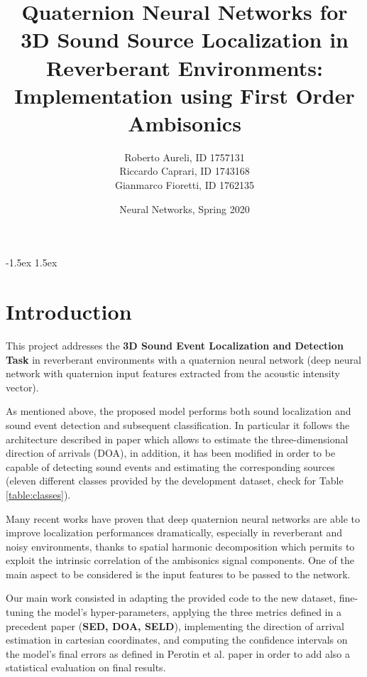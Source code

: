 \documentclass[11pt]{article}
\title{Quaternion Neural Networks for 3D Sound Source Localization in Reverberant Environments: Implementation using First Order Ambisonics}
\author{Roberto Aureli, ID 1757131\\
		Riccardo Caprari, ID 1743168\\
		Gianmarco Fioretti, ID 1762135}
\date{Neural Networks, Spring 2020}
\begin{document}
\maketitle

\vspace{10px}

\openup -1.5ex
\tableofcontents
\openup 1.5ex

\newpage
\section{Introduction}\label{cha:intro}

This project addresses the \textbf{3D Sound Event Localization and Detection Task} in reverberant environments with a  quaternion neural network (deep neural network with quaternion input features extracted from the acoustic intensity vector).\newline

\noindent
As mentioned above, the proposed model performs both sound localization and sound event detection and subsequent classification. In particular it follows the architecture described in paper \cite{paper2020} which allows to estimate the three-dimensional direction of arrivals (DOA), in addition, it has been modified in order to be capable of detecting sound events and estimating the corresponding sources (eleven different classes provided by the development dataset, check for Table \ref{table:classes}).\newline

\noindent
Many recent works have proven that deep quaternion neural networks are able to improve localization performances dramatically, especially in reverberant and noisy environments, thanks to spatial harmonic decomposition which permits to exploit the intrinsic correlation of the ambisonics signal components. One of the main aspect to be considered is the input features to be passed to the network.\newline

\noindent
Our main work consisted in adapting the provided code to the new dataset, fine-tuning the model's hyper-parameters, applying the three metrics defined in a precedent paper \cite{paper2019} (\textbf{SED, DOA, SELD}), implementing the direction of arrival estimation in cartesian coordinates, and computing the confidence intervals on the model's final errors as defined in Perotin et al. paper \cite{paper2018} in order to add also a statistical evaluation on final results.
\end{document}
